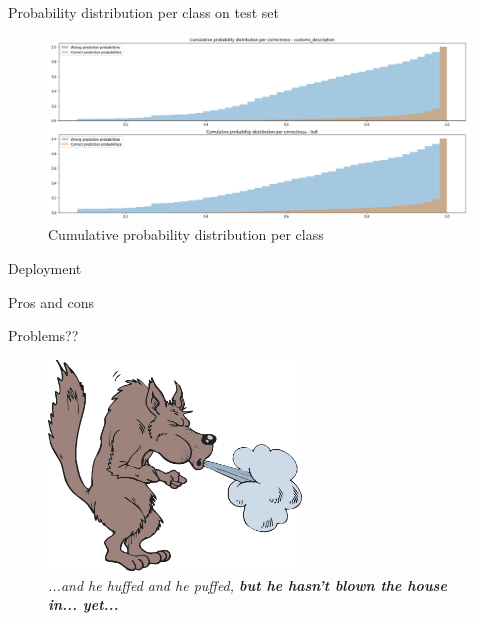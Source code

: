 \documentclass[9pt]{beamer}
\begin{document}
\begin{frame}{Probability distribution per class on test set}
\begin{figure}
		\includegraphics[width=\textwidth]{imgs/performance.png}
		\caption{Cumulative probability distribution per class}
	\end{figure}
\end{frame}



\begin{frame}{Deployment}

\end{frame}


\begin{frame}{Pros and cons}
\end{frame}



\begin{frame}{Problems??}
	\begin{center}
		\begin{figure}
			\includegraphics[width=0.6\textwidth,height=!]{imgs/huffedandpuffed.png}
			\caption{\textit{...and he huffed and he puffed, \textbf{but he hasn't blown the house in... yet...}}}
		\end{figure}
	\end{center}
\end{frame}
\end{document}

